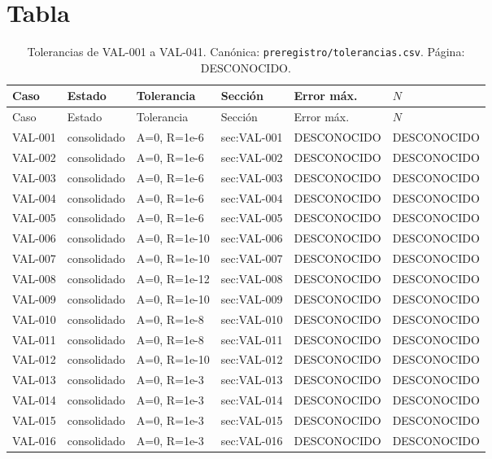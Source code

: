 \section{Tabla}
\begin{longtable}{@{}ll>{\raggedright\arraybackslash}p{4.6cm}lll@{}}
\caption{Tolerancias de VAL-001 a VAL-041. Canónica: \texttt{preregistro/tolerancias.csv}. Página: DESCONOCIDO.}\label{tab:tolerancias}\\
\toprule
Caso & Estado & Tolerancia & Sección & Error máx. & \(N\)\\
\midrule
\endfirsthead
\toprule
Caso & Estado & Tolerancia & Sección & Error máx. & \(N\)\\
\midrule
\endhead
VAL-001 & consolidado & A=0, R=1e-6 & sec:VAL-001 & DESCONOCIDO & DESCONOCIDO \\
VAL-002 & consolidado & A=0, R=1e-6 & sec:VAL-002 & DESCONOCIDO & DESCONOCIDO \\
VAL-003 & consolidado & A=0, R=1e-6 & sec:VAL-003 & DESCONOCIDO & DESCONOCIDO \\
VAL-004 & consolidado & A=0, R=1e-6 & sec:VAL-004 & DESCONOCIDO & DESCONOCIDO \\
VAL-005 & consolidado & A=0, R=1e-6 & sec:VAL-005 & DESCONOCIDO & DESCONOCIDO \\
VAL-006 & consolidado & A=0, R=1e-10 & sec:VAL-006 & DESCONOCIDO & DESCONOCIDO \\
VAL-007 & consolidado & A=0, R=1e-10 & sec:VAL-007 & DESCONOCIDO & DESCONOCIDO \\
VAL-008 & consolidado & A=0, R=1e-12 & sec:VAL-008 & DESCONOCIDO & DESCONOCIDO \\
VAL-009 & consolidado & A=0, R=1e-10 & sec:VAL-009 & DESCONOCIDO & DESCONOCIDO \\
VAL-010 & consolidado & A=0, R=1e-8 & sec:VAL-010 & DESCONOCIDO & DESCONOCIDO \\
VAL-011 & consolidado & A=0, R=1e-8 & sec:VAL-011 & DESCONOCIDO & DESCONOCIDO \\
VAL-012 & consolidado & A=0, R=1e-10 & sec:VAL-012 & DESCONOCIDO & DESCONOCIDO \\
VAL-013 & consolidado & A=0, R=1e-3 & sec:VAL-013 & DESCONOCIDO & DESCONOCIDO \\
VAL-014 & consolidado & A=0, R=1e-3 & sec:VAL-014 & DESCONOCIDO & DESCONOCIDO \\
VAL-015 & consolidado & A=0, R=1e-3 & sec:VAL-015 & DESCONOCIDO & DESCONOCIDO \\
VAL-016 & consolidado & A=0, R=1e-3 & sec:VAL-016 & DESCONOCIDO & DESCONOCIDO \\

\end{longtable}
